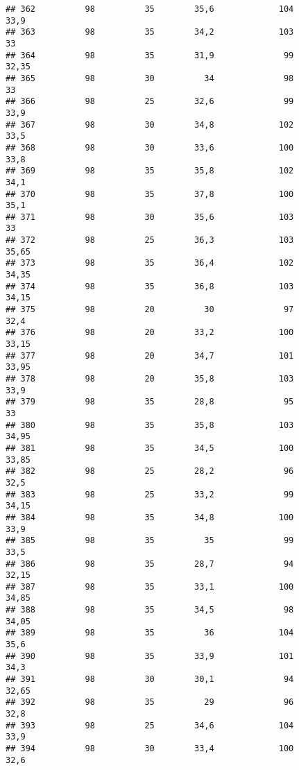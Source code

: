 \documentclass[
]{article}
\begin{document}
\begin{verbatim}
## 362          98          35        35,6             104                 33,9
## 363          98          35        34,2             103                   33
## 364          98          35        31,9              99                32,35
## 365          98          30          34              98                   33
## 366          98          25        32,6              99                 33,9
## 367          98          30        34,8             102                 33,5
## 368          98          30        33,6             100                 33,8
## 369          98          35        35,8             102                 34,1
## 370          98          35        37,8             100                 35,1
## 371          98          30        35,6             103                   33
## 372          98          25        36,3             103                35,65
## 373          98          35        36,4             102                34,35
## 374          98          35        36,8             103                34,15
## 375          98          20          30              97                 32,4
## 376          98          20        33,2             100                33,15
## 377          98          20        34,7             101                33,95
## 378          98          20        35,8             103                 33,9
## 379          98          35        28,8              95                   33
## 380          98          35        35,8             103                34,95
## 381          98          35        34,5             100                33,85
## 382          98          25        28,2              96                 32,5
## 383          98          25        33,2              99                34,15
## 384          98          35        34,8             100                 33,9
## 385          98          35          35              99                 33,5
## 386          98          35        28,7              94                32,15
## 387          98          35        33,1             100                34,85
## 388          98          35        34,5              98                34,05
## 389          98          35          36             104                 35,6
## 390          98          35        33,9             101                 34,3
## 391          98          30        30,1              94                32,65
## 392          98          35          29              96                 32,8
## 393          98          25        34,6             104                 33,9
## 394          98          30        33,4             100                 32,6

\end{verbatim}
\end{document}
